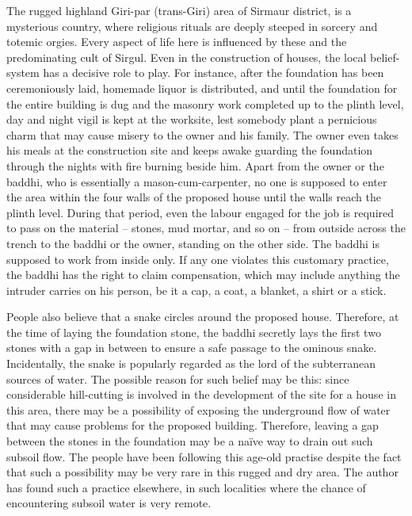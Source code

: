 The rugged highland Giri-par (trans-Giri) area of Sirmaur district, is a mysterious country, where religious rituals are deeply steeped in sorcery and totemic orgies. Every aspect of life here is influenced by these and the predominating cult of Sirgul. Even in the construction of houses, the local belief-system has a decisive role to play. For instance, after the foundation has been ceremoniously laid, homemade liquor is distributed, and until the foundation for the entire building is dug and the masonry work completed up to the plinth level, day and night vigil is kept at the worksite, lest somebody plant a pernicious charm that may cause misery to the owner and his family. The owner even takes his meals at the construction site and keeps awake guarding the foundation through the nights with fire burning beside him. Apart from the owner or the baddhi, who is essentially a mason-cum-carpenter, no one is supposed to enter the area within the four walls of the proposed house until the walls reach the plinth level. During that period, even the labour engaged for the job is required to pass on the material – stones, mud mortar, and so on – from outside across the trench to the baddhi or the owner, standing on the other side. The baddhi is supposed to work from inside only. If any one violates this customary practice, the baddhi has the right to claim compensation, which may include anything the intruder carries on his person, be it a cap, a coat, a blanket, a shirt or a stick.

People also believe that a snake circles around the proposed house. Therefore, at the time of laying the foundation stone, the baddhi secretly lays the first two stones with a gap in between to ensure a safe passage to the ominous snake. Incidentally, the snake is popularly regarded as the lord of the subterranean sources of water. The possible reason for such belief may be this: since considerable hill-cutting is involved in the development of the site for a house in this area, there may be a possibility of exposing the underground flow of water that may cause problems for the proposed building. Therefore, leaving a gap between the stones in the foundation may be a naïve way to drain out such subsoil flow. The people have been following this age-old practise despite the fact that such a possibility may be very rare in this rugged and dry area. The author has found such a practice elsewhere, in such localities where the chance of encountering subsoil water is very remote.

